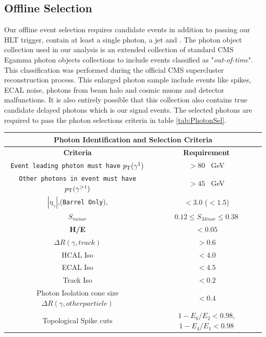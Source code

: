 \subsection{Offline Selection}
Our offline event selection requires candidate events in addition to passing our HLT trigger, contain at least a single photon, a jet and \MET . The photon object collection used in our analysis is an extended collection of standard CMS Egamma  photon objects collections to include events classified as "\textit{out-of-time}". This classification was performed during the official CMS supercluster reconstruction process. This enlarged  photon sample include events like spikes, ECAL noise, photons from beam halo and cosmic muons and detector malfunctions. It is also entirely possible that this collection also contains true candidate delayed photons which is our signal events.
The selected photons are required to pass the photon selections criteria in table \ref{tab:PhotonSel}. 
\begin{center}
\centering
\begin{tabular}{c c }
\multicolumn{2}{c}{\bfseries{Photon Identification  and Selection Criteria}} \\
  \hline 
  \bfseries{Criteria} & \bfseries{Requirement} \\
   \hline 
  \texttt{Event leading photon must have} $p_{\mathrm{T}}(\gamma^{1})$  & $ > 80$~ GeV \\
  \texttt{Other photons in event must have} $p_{\mathrm{T}}(\gamma^{>1})$  & $ > 45$~ GeV \\
  
 $|\eta_{\gamma}|$,(\texttt{Barrel Only}),  & $ < 3.0$ ($ < 1.5$) \\
 $S_{minor}$  & $ 0.12 \leq S_{Minor} \leq 0.38$ \\
 \textbf{H/E}  & $ < 0.05$ \\
 
 $\Delta R(\gamma, track)$  & $ > 0.6 $ \\
 
 HCAL Iso  & $ < 4.0 $ \\
 ECAL Iso   & $ < 4.5 $ \\
 Track Iso   & $ < 0.2 $ \\
 Photon Isolation cone size $\Delta R(\gamma, other particle)$ & $< 0.4$ \\
 Topological Spike cuts  & $1 - E_{6}/E_{2} < 0.98$, $ 1 - E_{4}/E_{1} < 0.98$ \\ 
  \hline 
\end{tabular}
\label{tab:PhotonSel}
\end{center}

